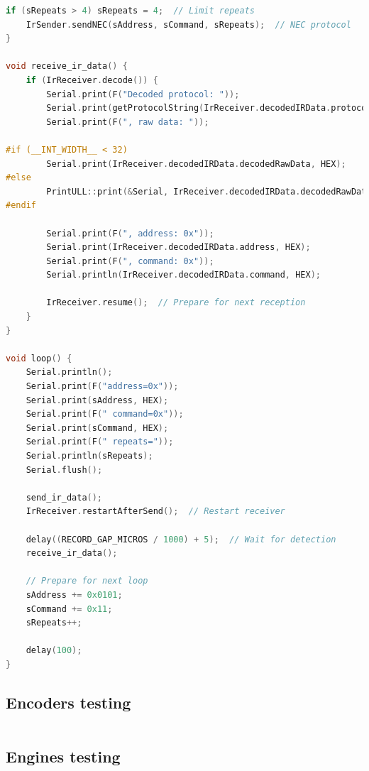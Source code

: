 \documentclass{article}
\begin{document}
\begin{lstlisting}[language=C, basicstyle=\ttfamily\footnotesize, frame=single, xleftmargin=10mm, xrightmargin=10mm]
    if (sRepeats > 4) sRepeats = 4;  // Limit repeats
    IrSender.sendNEC(sAddress, sCommand, sRepeats);  // NEC protocol
}

void receive_ir_data() {
    if (IrReceiver.decode()) {
        Serial.print(F("Decoded protocol: "));
        Serial.print(getProtocolString(IrReceiver.decodedIRData.protocol));
        Serial.print(F(", raw data: "));

#if (__INT_WIDTH__ < 32)
        Serial.print(IrReceiver.decodedIRData.decodedRawData, HEX);
#else
        PrintULL::print(&Serial, IrReceiver.decodedIRData.decodedRawData, HEX);
#endif

        Serial.print(F(", address: 0x"));
        Serial.print(IrReceiver.decodedIRData.address, HEX);
        Serial.print(F(", command: 0x"));
        Serial.println(IrReceiver.decodedIRData.command, HEX);

        IrReceiver.resume();  // Prepare for next reception
    }
}

void loop() {
    Serial.println();
    Serial.print(F("address=0x"));
    Serial.print(sAddress, HEX);
    Serial.print(F(" command=0x"));
    Serial.print(sCommand, HEX);
    Serial.print(F(" repeats="));
    Serial.println(sRepeats);
    Serial.flush();

    send_ir_data();
    IrReceiver.restartAfterSend();  // Restart receiver

    delay((RECORD_GAP_MICROS / 1000) + 5);  // Wait for detection
    receive_ir_data();

    // Prepare for next loop
    sAddress += 0x0101;
    sCommand += 0x11;
    sRepeats++;

    delay(100);
}
\end{lstlisting}

\newpage
\subsection{Encoders testing}
\begin{lstlisting}[language=C, basicstyle=\ttfamily\footnotesize, frame=single, xleftmargin=10mm, xrightmargin=10mm]

\end{lstlisting}

\newpage
\subsection{Engines testing}
\begin{lstlisting}[language=C, basicstyle=\ttfamily\footnotesize, frame=single, xleftmargin=10mm, xrightmargin=10mm]

\end{lstlisting}
\end{document}
